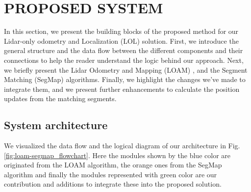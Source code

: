 \documentclass[letterpaper, 10 pt, conference]{ieeeconf}  %
\begin{document}
\section{PROPOSED SYSTEM} \label{proposed_system}
In this section, we present the building blocks of the proposed method for our Lidar-only odometry and Localization (LOL) solution. First, we introduce the general structure and the data flow between the different components and their connections to help the reader understand the logic behind our approach.
Next, we briefly present the Lidar Odometry and Mapping (LOAM) \cite{loam}, and the Segment Matching (SegMap) \cite{segmap} algorithms.
Finally, we highlight the changes we've made to integrate them, and we present further enhancements to calculate the position updates from the matching segments.  


\subsection{System architecture} \label{system_architecture}
We visualized the data flow and the logical diagram of our architecture in Fig. \ref{fig:loam-segmap_flowchart}. Here the modules shown by the blue color are originated from the LOAM algorithm, the orange ones from the SegMap algorithm and finally the modules represented with green color are our contribution and additions to integrate these into the proposed solution. 
\end{document}
